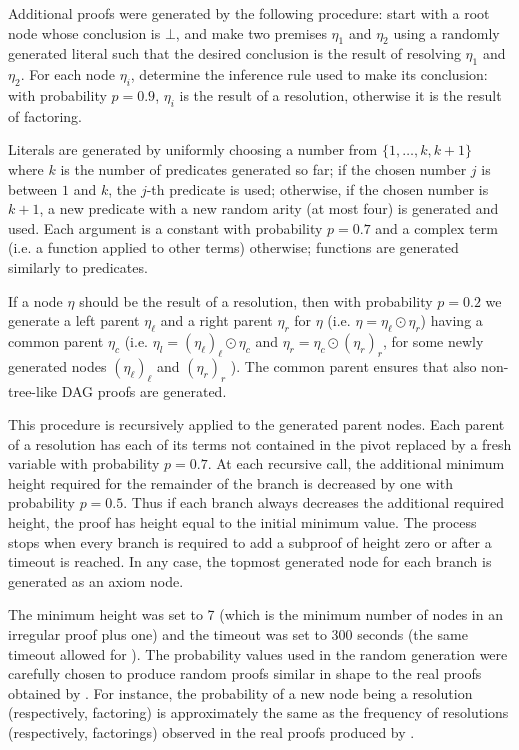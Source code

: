Additional proofs were generated by the following procedure: start with a root node whose conclusion is $\bot$, and make two premises $\eta_1$ and $\eta_2$ using a randomly generated literal such that the desired conclusion is the result of resolving $\eta_1$ and $\eta_2$. For each node $\eta_i$, determine the inference rule used to make its conclusion: with probability $p=0.9$, $\eta_i$ is the result of a resolution, otherwise it is the result of  factoring. 

Literals are generated by uniformly choosing a number from $\{1,\dots,k,k+1\}$ where $k$ is the number of predicates generated so far; if the chosen number $j$ is between $1$ and $k$, the $j$-th predicate is used; otherwise, if the chosen number is $k+1$, a new predicate with a new random arity (at most four) is generated and used. Each argument is a constant with probability $p=0.7$ and a complex term (i.e. a function applied to other terms) otherwise; functions are generated similarly to predicates. 

If a node $\eta$ should be the result of a resolution, then with probability $p=0.2$ we generate a left parent $\eta_\ell$ and a right parent $\eta_r$ for $\eta$ (i.e. $\eta = \eta_\ell \odot \eta_r$) having a common parent $\eta_c$ (i.e. $\eta_l = (\eta_\ell)_\ell \odot \eta_c$ and $\eta_r = \eta_c \odot (\eta_r)_r$, for some newly generated nodes $(\eta_\ell)_\ell$ and $(\eta_r)_r$ ). The common parent ensures that also non-tree-like DAG proofs are generated. 

This procedure is recursively applied to the generated parent nodes. 
Each parent of a resolution has each of its terms not contained in the pivot replaced by a fresh variable with probability $p=0.7$.
At each recursive call, the additional minimum height required for the remainder of the branch is decreased by one with probability $p=0.5$. Thus if each branch always decreases the additional required height, the proof has height equal to the initial minimum value. The process stops when every branch is required to add a subproof of height zero or after a timeout is reached. In any case, the topmost generated node for each branch is generated as an axiom node. 

The minimum height was set to 7 (which is the minimum number of nodes in an irregular proof plus one) and the timeout was set to 300 seconds (the same timeout allowed for {\SPASS}). The probability values used in the random generation were carefully chosen to produce random proofs similar in shape to the real proofs obtained by {\SPASS}. For instance, the probability of a new node being a resolution (respectively, factoring) is approximately the same as the frequency of resolutions (respectively, factorings) observed in the real proofs produced by {\SPASS}.